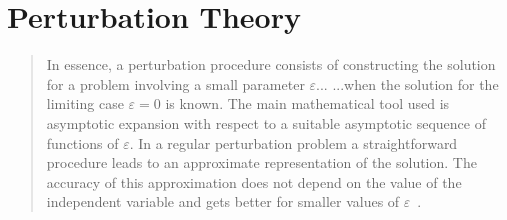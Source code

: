 


\section{Perturbation Theory}
\label{sec:pertTheory}

\begin{quote}
In essence, a perturbation procedure consists of constructing the solution for a problem involving a small parameter $\varepsilon$... ...when the solution for the limiting case $\varepsilon = 0$ is known. The main mathematical tool used is asymptotic expansion with respect to a suitable asymptotic sequence of functions of $\varepsilon$.
In a regular perturbation problem a straightforward procedure leads to an approximate representation of the solution. The accuracy of this approximation does not depend on the value of the independent variable and gets better for smaller values of $\varepsilon$~\cite{Kevorkian}.
\end{quote}

